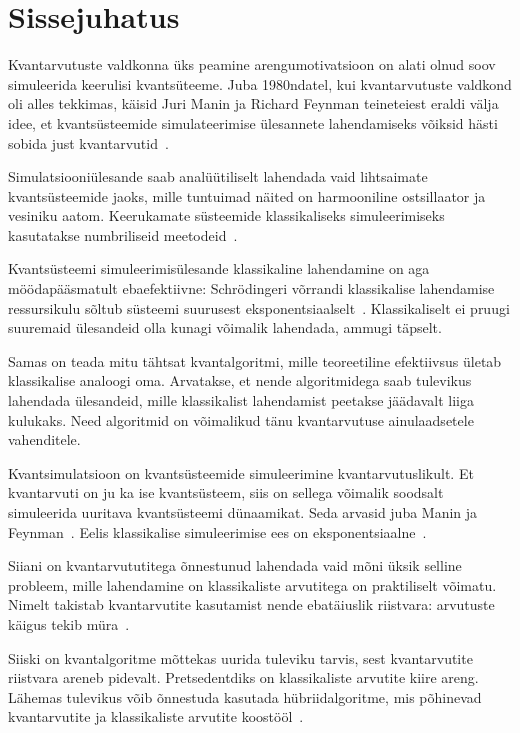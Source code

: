 \documentclass[12pt]{report}
\begin{document}
\tableofcontents

\chapter{Sissejuhatus}

Kvantarvutuste valdkonna üks peamine arengumotivatsioon on alati olnud soov simuleerida keerulisi kvantsüteeme.
Juba 1980ndatel, kui kvantarvutuste valdkond oli alles tekkimas, käisid Juri Manin ja Richard Feynman teineteiest eraldi välja idee, et kvantsüsteemide simulateerimise ülesannete lahendamiseks võiksid hästi sobida just kvantarvutid~\cite{manin, feynman}.

Simulatsiooniülesande saab analüütiliselt lahendada vaid lihtsaimate kvantsüsteemide jaoks, mille tuntuimad näited on harmooniline ostsillaator ja vesiniku aatom.
Keerukamate süsteemide klassikaliseks simuleerimiseks kasutatakse numbriliseid meetodeid~\cite{whitfield+etal2011, szabo+ostlund}.

Kvantsüsteemi simuleerimisülesande klassikaline lahendamine on aga möödapääsmatult ebaefektiivne: Schrödingeri võrrandi klassikalise lahendamise ressursikulu sõltub süsteemi suurusest eksponentsiaalselt~\cite{whitfield+etal2011, mcardle+etal, cao+etal, kassal+etal}.
Klassikaliselt ei pruugi suuremaid ülesandeid olla kunagi võimalik lahendada, ammugi täpselt.

Samas on teada mitu tähtsat kvantalgoritmi, mille teoreetiline efektiivsus ületab klassikalise analoogi oma.
Arvatakse, et nende algoritmidega saab tulevikus lahendada ülesandeid, mille klassikalist lahendamist peetakse jäädavalt liiga kulukaks.
Need algoritmid on võimalikud tänu kvantarvutuse ainulaadsetele vahenditele.

Kvantsimulatsioon on kvantsüsteemide simuleerimine kvantarvutuslikult.
Et kvantarvuti on ju ka ise kvantsüsteem, siis on sellega võimalik soodsalt simuleerida uuritava kvantsüsteemi dünaamikat.
Seda arvasid juba Manin ja Feynman~\cite{manin, feynman}.
Eelis klassikalise simuleerimise ees on eksponentsiaalne~\cite{whitfield+etal2011, mcardle+etal, cao+etal}.

Siiani on kvantarvututitega õnnestunud lahendada vaid mõni üksik selline probleem, mille lahendamine on klassikaliste arvutitega on praktiliselt võimatu.
Nimelt takistab kvantarvutite kasutamist nende ebatäiuslik riistvara: arvutuste käigus tekib müra~\cite{whitfield+etal2022}.

Siiski on kvantalgoritme mõttekas uurida tuleviku tarvis, sest kvantarvutite riistvara areneb pidevalt.
Pretsedentdiks on klassikaliste arvutite kiire areng.
Lähemas tulevikus võib õnnestuda kasutada hübriidalgoritme, mis põhinevad kvantarvutite ja klassikaliste arvutite koostööl~\cite{omalley+etal}.
\end{document}
